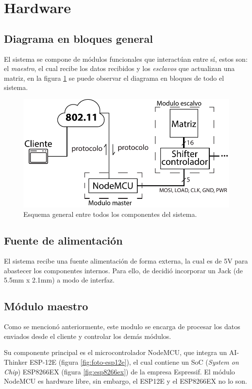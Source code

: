 \section{Hardware}\label{sec:hw}
\subsection{Diagrama en bloques general}
El sistema se compone de módulos funcionales que interactúan entre sí, estos son: el \emph{maestro}, el cual recibe los datos recibidos y los \emph{esclavos} que actualizan una matriz, en la figura \ref{fig:diagrama-bloques-general} se puede observar el diagrama en bloques de todo el sistema.

\begin{figure}[!ht]
	\centering
	\includegraphics[width=\linewidth]{imagenes/hw/diagrama-bloques-general.pdf}
	\caption{Esquema general entre todos los componentes del sistema.}
	\label{fig:diagrama-bloques-general}
\end{figure}

\subsection{Fuente de alimentación}
El sistema recibe una fuente alimentación de forma externa, la cual es de 5V para abastecer los componentes internos. Para ello, de decidió incorporar un Jack (de 5.5mm x 2.1mm) a modo de interfaz.

\subsection{Módulo maestro}
Como se mencionó anteriormente, este modulo se encarga de procesar los datos enviados desde el cliente y controlar los demás módulos.

Su componente principal es el microcontrolador NodeMCU, que integra un AI-Thinker ESP-12E (figura \ref{fig:foto-esp12e}), el cual contiene un SoC (\emph{System on Chip}) ESP8266EX (figura \ref{fig:esp8266ex}) de la empresa Espressif. El módulo NodeMCU es hardware libre, sin embargo, el ESP12E y el ESP8266EX no lo son.\cite{NodeMCU}

